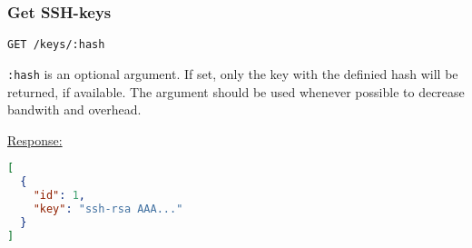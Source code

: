 %
%
%
%
%
%
%


\subsubsection{Get SSH-keys}

\begin{lstlisting}[language=http_request]
GET /keys/:hash
\end{lstlisting}

\lstinline[language=http_request]{:hash} is an optional argument. If set, only
the key with the definied hash will be returned, if available. The argument
should be used whenever possible to decrease bandwith and overhead.

{\tiny \underline{Response:}}
\begin{lstlisting}[language=json, numbers=none]
[
  {
    "id": 1,
    "key": "ssh-rsa AAA..."
  }
]
\end{lstlisting}
